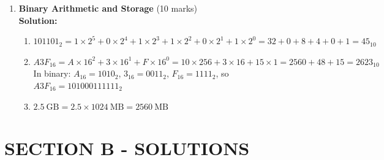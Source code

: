 \documentclass[12pt]{article}
\begin{document}
\begin{enumerate}[left=0pt, label=\bfseries Q\arabic*., start=1]
    \item \textbf{Binary Arithmetic and Storage} \hfill (10 marks)\\
    \textbf{Solution:}
    \begin{enumerate}[label=(\alph*)]
        \item $101101_2 = 1\times2^5 + 0\times2^4 + 1\times2^3 + 1\times2^2 + 0\times2^1 + 1\times2^0 = 32 + 0 + 8 + 4 + 0 + 1 = 45_{10}$
        \item $A3F_{16} = A\times16^2 + 3\times16^1 + F\times16^0 = 10\times256 + 3\times16 + 15\times1 = 2560 + 48 + 15 = 2623_{10}$\\
        In binary: $A_{16}=1010_2$, $3_{16}=0011_2$, $F_{16}=1111_2$, so $A3F_{16} = 101000111111_2$
        \item $2.5\ \text{GB} = 2.5 \times 1024\ \text{MB} = 2560\ \text{MB}$
    \end{enumerate}
\end{enumerate}

\newpage

\section*{SECTION B - SOLUTIONS}
\end{document}
